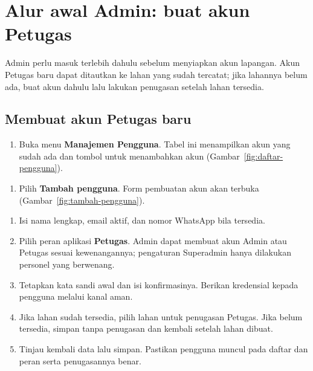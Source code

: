 \section{Alur awal Admin: buat akun Petugas}

Admin perlu masuk terlebih dahulu sebelum menyiapkan akun lapangan. Akun Petugas baru dapat ditautkan ke lahan yang sudah tercatat; jika lahannya belum ada, buat akun dahulu lalu lakukan penugasan setelah lahan tersedia.

\subsection{Membuat akun Petugas baru}

\begin{enumerate}[series=admin-akun]
  \item Buka menu \textbf{Manajemen Pengguna}. Tabel ini menampilkan akun yang sudah ada dan tombol untuk menambahkan akun (Gambar~\ref{fig:daftar-pengguna}).
\end{enumerate}


\begin{enumerate}[resume=admin-akun]
  \item Pilih \textbf{Tambah pengguna}. Form pembuatan akun akan terbuka (Gambar~\ref{fig:tambah-pengguna}).
\end{enumerate}


\begin{enumerate}[resume=admin-akun]
  \item Isi nama lengkap, email aktif, dan nomor WhatsApp bila tersedia.
  \item Pilih peran aplikasi \textbf{Petugas}. Admin dapat membuat akun Admin atau Petugas sesuai kewenangannya; pengaturan Superadmin hanya dilakukan personel yang berwenang.
  \item Tetapkan kata sandi awal dan isi konfirmasinya. Berikan kredensial kepada pengguna melalui kanal aman.
  \item Jika lahan sudah tersedia, pilih lahan untuk penugasan Petugas. Jika belum tersedia, simpan tanpa penugasan dan kembali setelah lahan dibuat.
  \item Tinjau kembali data lalu simpan. Pastikan pengguna muncul pada daftar dan peran serta penugasannya benar.
\end{enumerate}

